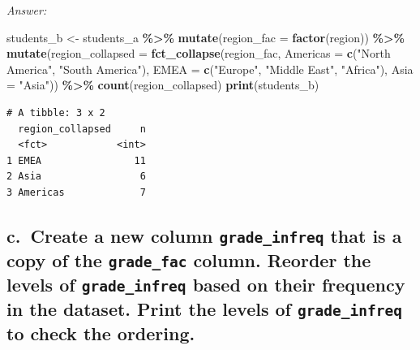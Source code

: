 \documentclass[
]{book}
\newenvironment{Shaded}{\begin{snugshade}}{\end{snugshade}}
\newcommand{\AttributeTok}[1]{\textcolor[rgb]{0.13,0.29,0.53}{#1}}
\newcommand{\FunctionTok}[1]{\textcolor[rgb]{0.13,0.29,0.53}{\textbf{#1}}}
\newcommand{\NormalTok}[1]{#1}
\newcommand{\OtherTok}[1]{\textcolor[rgb]{0.56,0.35,0.01}{#1}}
\newcommand{\SpecialCharTok}[1]{\textcolor[rgb]{0.81,0.36,0.00}{\textbf{#1}}}
\newcommand{\StringTok}[1]{\textcolor[rgb]{0.31,0.60,0.02}{#1}}
\begin{document}
\emph{Answer:}

\begin{Shaded}
\begin{Highlighting}[]
\NormalTok{students\_b }\OtherTok{\textless{}{-}}\NormalTok{ students\_a }\SpecialCharTok{\%\textgreater{}\%}
  \FunctionTok{mutate}\NormalTok{(}\AttributeTok{region\_fac =} \FunctionTok{factor}\NormalTok{(region)) }\SpecialCharTok{\%\textgreater{}\%}
  \FunctionTok{mutate}\NormalTok{(}\AttributeTok{region\_collapsed =} \FunctionTok{fct\_collapse}\NormalTok{(region\_fac, }
                                         \AttributeTok{Americas =} \FunctionTok{c}\NormalTok{(}\StringTok{"North America"}\NormalTok{, }\StringTok{"South America"}\NormalTok{), }
                                         \AttributeTok{EMEA =} \FunctionTok{c}\NormalTok{(}\StringTok{"Europe"}\NormalTok{, }\StringTok{"Middle East"}\NormalTok{, }\StringTok{"Africa"}\NormalTok{), }
                                         \AttributeTok{Asia =} \StringTok{"Asia"}\NormalTok{)) }\SpecialCharTok{\%\textgreater{}\%}
  \FunctionTok{count}\NormalTok{(region\_collapsed)}
\FunctionTok{print}\NormalTok{(students\_b)}
\end{Highlighting}
\end{Shaded}

\begin{verbatim}
# A tibble: 3 x 2
  region_collapsed     n
  <fct>            <int>
1 EMEA                11
2 Asia                 6
3 Americas             7
\end{verbatim}

\hypertarget{c.-create-a-new-column-grade_infreq-that-is-a-copy-of-the-grade_fac-column.-reorder-the-levels-of-grade_infreq-based-on-their-frequency-in-the-dataset.-print-the-levels-of-grade_infreq-to-check-the-ordering.}{%
\subsection{\texorpdfstring{c.~Create a new column \texttt{grade\_infreq} that is a copy of the \texttt{grade\_fac} column. Reorder the levels of \texttt{grade\_infreq} based on their frequency in the dataset. Print the levels of \texttt{grade\_infreq} to check the ordering.}{c.~Create a new column grade\_infreq that is a copy of the grade\_fac column. Reorder the levels of grade\_infreq based on their frequency in the dataset. Print the levels of grade\_infreq to check the ordering.}}\label{c.-create-a-new-column-grade_infreq-that-is-a-copy-of-the-grade_fac-column.-reorder-the-levels-of-grade_infreq-based-on-their-frequency-in-the-dataset.-print-the-levels-of-grade_infreq-to-check-the-ordering.}}
\end{document}
